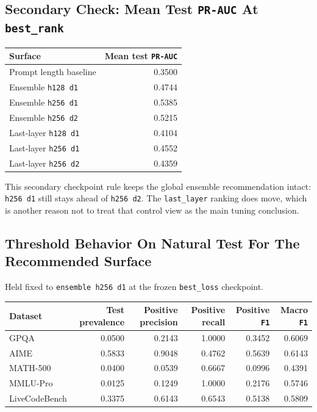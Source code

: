 \documentclass[11pt]{article}
\begin{document}
\subsection*{Secondary Check: Mean Test \texttt{PR-AUC} At \texttt{best\_rank}}
\begin{center}
\small
\begin{tabular}{@{}lr@{}}
\toprule
Surface & Mean test \texttt{PR-AUC} \\
\midrule
Prompt length baseline & 0.3500 \\
Ensemble \texttt{h128 d1} & 0.4744 \\
Ensemble \texttt{h256 d1} & 0.5385 \\
Ensemble \texttt{h256 d2} & 0.5215 \\
Last-layer \texttt{h128 d1} & 0.4104 \\
Last-layer \texttt{h256 d1} & 0.4552 \\
Last-layer \texttt{h256 d2} & 0.4359 \\
\bottomrule
\end{tabular}
\end{center}

This secondary checkpoint rule keeps the global ensemble recommendation intact: \texttt{h256 d1} still stays ahead of \texttt{h256 d2}. The \texttt{last\_layer} ranking does move, which is another reason not to treat that control view as the main tuning conclusion.

\subsection*{Threshold Behavior On Natural Test For The Recommended Surface}
Held fixed to \texttt{ensemble h256 d1} at the frozen \texttt{best\_loss} checkpoint.

\begin{center}
\small
\setlength{\tabcolsep}{4pt}
\begin{tabular}{@{}lrrrrr@{}}
\toprule
Dataset & Test prevalence & Positive precision & Positive recall & Positive \texttt{F1} & Macro \texttt{F1} \\
\midrule
GPQA & 0.0500 & 0.2143 & 1.0000 & 0.3452 & 0.6069 \\
AIME & 0.5833 & 0.9048 & 0.4762 & 0.5639 & 0.6143 \\
MATH-500 & 0.0400 & 0.0539 & 0.6667 & 0.0996 & 0.4391 \\
MMLU-Pro & 0.0125 & 0.1249 & 1.0000 & 0.2176 & 0.5746 \\
LiveCodeBench & 0.3375 & 0.6143 & 0.6543 & 0.5138 & 0.5809 \\
\bottomrule
\end{tabular}
\end{center}
\end{document}
